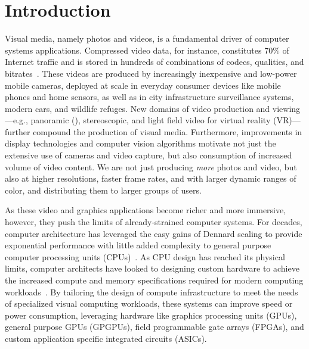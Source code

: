 \chapter{Introduction}\label{ch:introduction}
Visual media, namely photos and videos, is a fundamental driver of computer systems applications.
Compressed video data, for instance, constitutes 70\% of Internet traffic and is stored in hundreds of combinations of codecs, qualities, and bitrates~\cite{netflix2015encoding, cisco2017zettabyte}.
These videos are produced by increasingly inexpensive and low-power mobile cameras, deployed at scale in everyday consumer devices like mobile phones and home sensors, as well as in city infrastructure surveillance systems, modern cars, and wildlife refuges.
New domains of video production and viewing---e.g., panoramic (\threesixty), stereoscopic, and light field video for virtual reality (VR)---further compound the production of visual media.
Furthermore, improvements in display technologies and computer vision algorithms motivate not just the extensive use of cameras and video capture, but also consumption of increased volume of video content.
We are not just producing \emph{more} photos and video, but also at higher resolutions, faster frame rates, and with larger dynamic ranges of color, and distributing them to larger groups of users.

As these video and graphics applications become richer and more immersive, however, they push the limits of already-strained computer systems.
For decades, computer architecture has leveraged the easy gains of Dennard scaling to provide exponential performance with little added complexity to general purpose computer processing units (CPUs)~\cite{esmaeilzadeh2011dark}.
As CPU design has reached its physical limits, computer architects have looked to designing custom hardware to achieve the increased compute and memory specifications required for modern computing workloads~\cite{tpu, q100, qadeer}.
By tailoring the design of compute infrastructure to meet the needs of specialized visual computing workloads, these systems can improve speed or power consumption, leveraging hardware like graphics processing units (GPUs), general purpose GPUs (GPGPUs), field programmable gate arrays (FPGAs), and custom application specific integrated circuits (ASICs).

